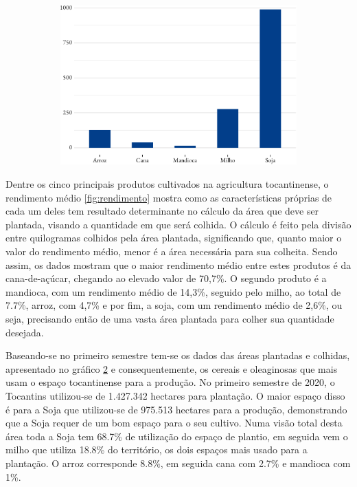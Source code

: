 \begin{figure}[!h]
\begin{subfigure}{\linewidth}
		\includegraphics{fig/area_plantada-1.pdf}
		\label{fig:areaplantada}
	\end{subfigure}
\end{figure}

\par Dentre os cinco principais produtos cultivados na agricultura tocantinense, o rendimento médio \ref{fig:rendimento} mostra como as características próprias de cada um deles tem resultado determinante no cálculo da área que deve ser plantada, visando a quantidade em que será colhida. O cálculo é feito pela divisão entre quilogramas colhidos pela área plantada, significando que, quanto maior o valor do rendimento médio, menor é a área necessária para sua colheita. Sendo assim, os dados mostram que o maior rendimento médio entre estes produtos é da cana-de-açúcar, chegando ao elevado valor de 70,7\%. O segundo produto é a mandioca, com um rendimento médio de 14,3\%, seguido pelo milho, ao total de 7.7\%, arroz, com 4,7\% e por fim, a soja, com um rendimento médio de 2,6\%, ou seja, precisando então de uma vasta área plantada para colher sua quantidade desejada.


\par Baseando-se no primeiro semestre tem-se os dados das áreas plantadas e colhidas, apresentado no gráfico \ref{fig:areaplantada} e consequentemente, os cereais e oleaginosas que mais usam o espaço tocantinense para a produção. No primeiro semestre de 2020, o Tocantins utilizou-se de 1.427.342 hectares para plantação. O maior espaço disso é para a Soja que utilizou-se de 975.513 hectares para a produção, demonstrando que a Soja requer de um bom espaço para o seu cultivo. Numa visão total desta área toda a Soja tem 68.7\% de utilização do espaço de plantio, em seguida vem o milho que utiliza 18.8\% do território, os dois espaços mais usado para a plantação. O arroz corresponde 8.8\%, em seguida cana com 2.7\% e mandioca com 1\%.


